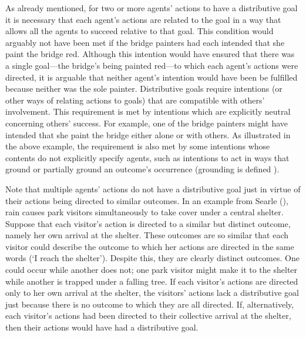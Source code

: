 \documentclass[12pt,a4paper]{extarticle}
\begin{document}
As already mentioned, for two or more agents' actions to have a distributive goal it is necessary that each agent's actions are related to the goal in a way that allows all the agents to succeed relative to that goal.  
This condition would arguably not have been met if the bridge painters had each intended that she paint the bridge red.
Although this intention would have ensured that there was a single goal---the bridge's being painted red---to which each agent's actions were directed, it is arguable that neither agent's intention would have been be fulfilled because neither was the sole painter.
Distributive goals require intentions (or other ways of relating actions to goals) that are compatible with others' involvement.
This requirement is met by intentions which are explicitly neutral concerning others' success.  
For example, one of the bridge painters might have intended that she paint the bridge either alone or with others.
As illustrated in the above example, the requirement is also met by some intentions whose contents do not explicitly specify agents, such as intentions to act in ways that ground or partially ground an outcome's occurrence (grounding is defined ).


Note that multiple agents' actions do not have a distributive goal just in virtue of their actions being directed to similar outcomes.  
In an example from Searle (\citeyear[p.\ 92]{Searle:1990em}), rain causes park visitors simultaneously to take cover under a central shelter.  
Suppose that each visitor's action is directed to a similar but distinct outcome, namely her own arrival at the shelter.  
These outcomes are so similar that each visitor could describe the outcome to which her actions are directed in the same words (`I reach the shelter').
Despite this, they are clearly distinct outcomes.
One could occur while another does not; 
one park visitor might make it to the shelter while another is trapped under a falling tree.
If each visitor's actions are directed only to her own arrival at the shelter, the visitors' actions lack a distributive goal just because there is no outcome to which they are all directed.
If, alternatively, each visitor's actions had been directed to their collective arrival at the shelter, then their actions would have had a distributive goal.
\end{document}
